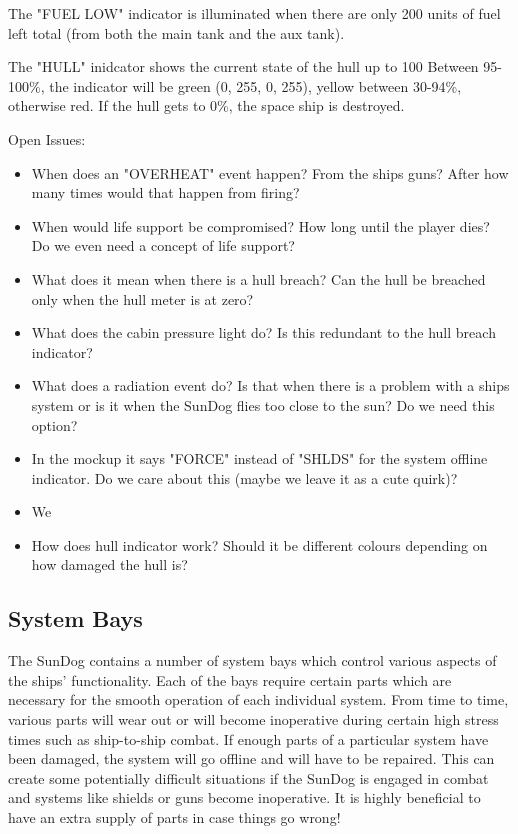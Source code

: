 The "FUEL LOW" indicator is illuminated when there are only 200 units
of fuel left total (from both the main tank and the aux tank).

The "HULL" inidcator shows the current state of the hull up to 100%
Between 95-100\%, the indicator will be green (0, 255, 0, 255),
yellow between 30-94\%, otherwise red.  If the hull gets to 0\%, the
space ship is destroyed. 


Open Issues:
\begin{itemize}
\item When does an "OVERHEAT" event happen?  From the ships guns?  After
how many times would that happen from firing?
\item When would life support be compromised?  How long until the player dies?
Do we even need a concept of life support?
\item What does it mean when there is a hull breach?  Can the hull be breached
only when the hull meter is at zero?
\item What does the cabin pressure light do?  Is this redundant to 
the hull breach indicator?
\item What does a radiation event do?  Is that when there is a problem with
a ships system or is it when the SunDog flies too close to the sun?  Do
we need this option?
\item In the mockup it says "FORCE" instead of "SHLDS" for the system
offline indicator.  Do we care about this (maybe we leave it as a cute
quirk)?
\item We 
\item How does hull indicator work?  Should it be different colours depending
on how damaged the hull is?
\end{itemize}

\subsection{System Bays}
The SunDog contains a number of system bays which control various aspects of
the ships' functionality.  Each of the bays require certain parts which are
necessary for the smooth operation of each individual system.  From time to
time, various parts will wear out or will become inoperative during certain
high stress times such as ship-to-ship combat.  If enough parts of a particular
system have been damaged, the system will go offline and will have to be
repaired.  This can create some potentially difficult situations if the
SunDog is engaged in combat and systems like shields or guns become
inoperative.  It is highly beneficial to have an extra supply of parts in
case things go wrong!

